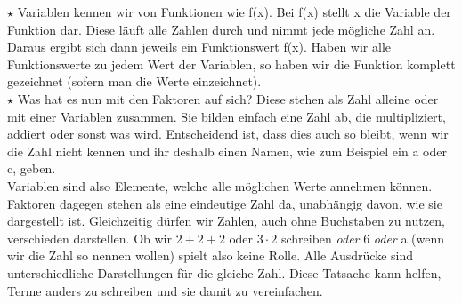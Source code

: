 	\(\star\) Variablen kennen wir von Funktionen wie f(x). Bei f(x) stellt x die
	Variable der Funktion dar. Diese läuft alle Zahlen durch und nimmt jede
	mögliche Zahl an. Daraus ergibt sich dann jeweils ein Funktionswert f(x). Haben
	wir alle Funktionswerte zu jedem Wert der Variablen, so haben wir die Funktion
	komplett gezeichnet (sofern man die Werte einzeichnet). \\
	\(\star\) Was hat es nun mit den Faktoren auf sich? Diese stehen als Zahl
	alleine oder mit einer Variablen zusammen. Sie bilden einfach eine Zahl ab, die
	multipliziert, addiert oder sonst was wird. Entscheidend ist, dass dies auch so
	bleibt, wenn wir die Zahl nicht kennen und ihr deshalb einen Namen, wie zum
	Beispiel ein a oder c, geben.\\
	Variablen sind also Elemente, welche alle möglichen Werte annehmen können.
	Faktoren dagegen stehen als eine eindeutige Zahl da, unabhängig davon, wie sie
	dargestellt ist.
	Gleichzeitig dürfen wir Zahlen, auch ohne Buchstaben zu nutzen, verschieden
	darstellen. Ob wir \(2+2+2\text{ oder }3\cdot 2\) schreiben \textit{oder} 6
	\textit{oder} a (wenn wir die Zahl so nennen wollen) spielt also keine Rolle.
	Alle Ausdrücke sind unterschiedliche Darstellungen für die gleiche Zahl. Diese
	Tatsache kann helfen, Terme anders zu schreiben und sie damit zu
	vereinfachen.\\
